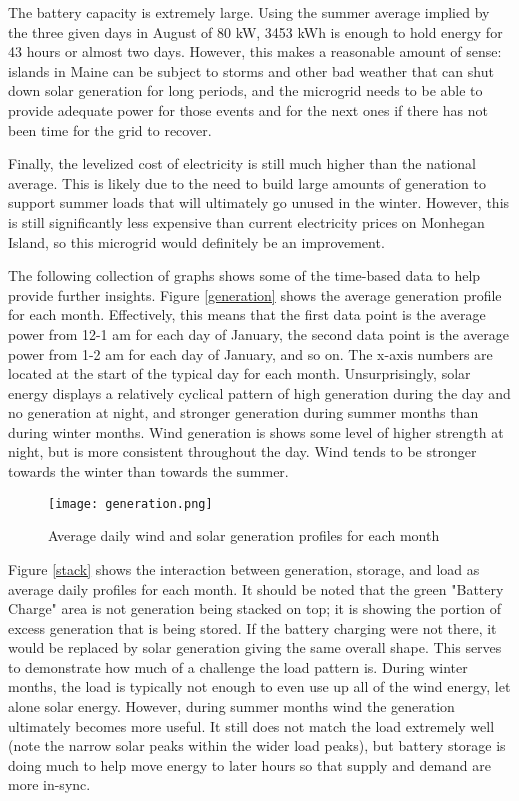 \documentclass{article}
\begin{document}
The battery capacity is extremely large. Using the summer average implied by the three given days in August of 80 kW, 3453 kWh is enough to hold energy for 43 hours or almost two days.  However, this makes a reasonable amount of sense: islands in Maine can be subject to storms and other bad weather that can shut down solar generation for long periods, and the microgrid needs to be able to provide adequate power for those events and for the next ones if there has not been time for the grid to recover.

Finally, the levelized cost of electricity is still much higher than the national average.  This is likely due to the need to build large amounts of generation to support summer loads that will ultimately go unused in the winter.   However, this is still significantly less expensive than current electricity prices on Monhegan Island, so this microgrid would definitely be an improvement.

The following collection of graphs shows some of the time-based data to help provide further insights.  Figure \ref{generation} shows the average generation profile for each month.  Effectively, this means that the first data point is the average power from 12-1 am for each day of January, the second data point is the average power from 1-2 am for each day of January, and so on.  The x-axis numbers are located at the start of the typical day for each month.  Unsurprisingly, solar energy displays a relatively cyclical pattern of high generation during the day and no generation at night, and stronger generation during summer months than during winter months.  Wind generation is shows some level of higher strength at night, but is more consistent throughout the day.  Wind tends to be stronger towards the winter than towards the summer.

\begin{figure}[htb]
\begin{center}
\texttt{[image: generation.png]}
\caption{Average daily wind and solar generation profiles for each month}
\label{fig:generation}
\end{center}
\end{figure}

Figure \ref{stack} shows the interaction between generation, storage, and load as average daily profiles for each month.  It should be noted that the green "Battery Charge" area is not generation being stacked on top; it is showing the portion of excess generation that is being stored.  If the battery charging were not there, it would be replaced by solar generation giving the same overall shape.  This serves to demonstrate how much of a challenge the load pattern is.  During winter months, the load is typically not enough to even use up all of the wind energy, let alone solar energy.   However, during summer months wind the generation ultimately becomes more useful.  It still does not match the load extremely well (note the narrow solar peaks within the wider load peaks), but battery storage is doing much to help move energy to later hours so that supply and demand are more in-sync.
\end{document}
